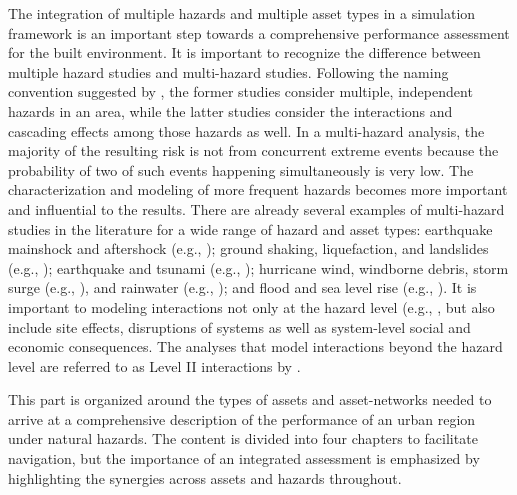 \begin{partbacktext}
The integration of multiple hazards and multiple asset types in a simulation framework is an important step towards a comprehensive performance assessment for the built environment. It is important to recognize the difference between multiple hazard studies and multi-hazard studies. Following the naming convention suggested by \citet{bruneau2017state}, the former studies consider multiple, independent hazards in an area, while the latter studies consider the interactions and cascading effects among those hazards as well. In a multi-hazard analysis, the majority of the resulting risk is not from concurrent extreme events because the probability of two of such events happening simultaneously is very low. The characterization and modeling of more frequent hazards becomes more important and influential to the results. There are already several examples of multi-hazard studies in the literature for a wide range of hazard and asset types: earthquake mainshock and aftershock (e.g., \cite{nazari2015effect, zhang2013damage}); ground shaking, liquefaction, and landslides (e.g., \cite{elgamal2008three, kojima2014large}); earthquake and tsunami (e.g., \cite{akiyama2014reliability, carey2019multihazard}); hurricane wind, windborne debris, storm surge (e.g., \cite{lin2010windborne, park2014abv}), and rainwater (e.g., \cite{pita2012assessment}); and flood and sea level rise (e.g., \cite{hinkel2014coastal}). It is important to modeling interactions not only at the hazard level (e.g., \cite{gill2014reviewing}, but also include site effects, disruptions of systems as well as system-level social and economic consequences. The analyses that model interactions beyond the hazard level are referred to as Level II interactions by \citet{zaghi2016establishing}.

This part is organized around the types of assets and asset-networks needed to arrive at a comprehensive description of the performance of an urban region under natural hazards. The content is divided into four chapters to facilitate navigation, but the importance of an integrated assessment is emphasized by highlighting the synergies across assets and hazards throughout.

\end{partbacktext}
